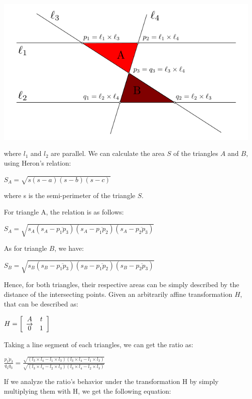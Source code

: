 \documentclass[]{article}
\begin{document}
\centerline {
	\includegraphics[scale=0.5]{scr4}
}

where $l_1$ and $l_2$ are parallel. We can calculate the area $S$ of the triangles $A$ and $B$, using Heron's relation:

\centerline {
	$S_A = \sqrt{s(s-a)(s-b)(s-c)}$
} 

where s is the semi-perimeter of the triangle $S$.

For triangle A, the relation is as follows:

\centerline {
	$S_A=\sqrt{s_A(s_A - \overline{p_1p_3})(s_A - \overline{p_1p_2}) (s_A - \overline{p_2p_3})}$
}

As for triangle $B$, we have:

\centerline {
	$S_B=\sqrt{s_B(s_B - \overline{p_1p_3})(s_B - \overline{p_1p_2}) (s_B - \overline{p_2p_3})}$
}

Hence, for both triangles, their respective areas can be simply described by the distance of the intersecting points. Given an arbitrarily affine transformation $H$, that can be described as:



\centerline{ $H = \left[ {\begin{array}{*{20}c}
		A & t \\
		\overrightarrow{0} & 1   
		\end{array} } \right]$ }

Taking a line segment of each triangles, we can get the ratio as:

\centerline {
	$\frac{\overline{p_1p_3}}{\overline{q_2q_3}} = \frac{\sqrt{(l_3 \times l_4 - l_1 \times l_3)(l_3 \times l_4 - l_1 \times l_3)}}{\sqrt{(l_3 \times l_4 - l_2 \times l_3)(l_3 \times l_4 - l_2 \times l_3)}}$
}

If we analyze the ratio's behavior under the transformation H by simply multiplying them with H, we get the following equation: 
\end{document}
